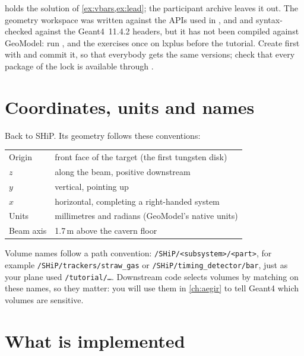 \begin{organisernote}
 holds the solution of \cref{ex:vbars,ex:lead};
the participant archive leaves it out. The geometry workspace was written
against the APIs used in ,  and
 and syntax-checked against the Geant4~11.4.2 headers, but it has
not been compiled against GeoModel: run ,  and the exercises once on lxplus before the tutorial. Create
 first with  and commit it, so that everybody
gets the same versions; check that every package of the lock is available
through .
\end{organisernote}

\section{Coordinates, units and names}
\label{sec:coordinates}

Back to SHiP. Its geometry follows these conventions:

\begin{center}
\begin{tabularx}{0.9\linewidth}{lL}
\toprule
Origin   & front face of the target (the first tungsten disk) \\
$z$      & along the beam, positive downstream \\
$y$      & vertical, pointing up \\
$x$      & horizontal, completing a right-handed system \\
Units    & millimetres and radians (GeoModel's native units) \\
Beam axis& 1.7\,m above the cavern floor \\
\bottomrule
\end{tabularx}
\end{center}

Volume names follow a path convention: \texttt{/SHiP/<subsystem>/<part>}, for
example \texttt{/SHiP/trackers/straw\_gas} or
\texttt{/SHiP/timing\_detector/bar}, just as your plane used
\texttt{/tutorial/\ldots}. Downstream code selects volumes by
matching on these names, so they matter: you will use them in
\cref{ch:aegir} to tell Geant4 which volumes are sensitive.

\section{What is implemented}

